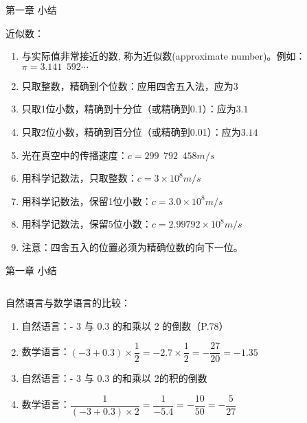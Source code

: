\documentclass[aspectratio=169]{ctexbeamer} %
\begin{document}
\begin{frame}[t]{第一章 小结}
\begin{spacing}{1.2}
\normalsize
\alert{近似数：}
\begin{enumerate}[label={\arabic*.}]
\item 与实际值非常接近的数, 称为近似数(approximate number)。例如：\\
$\pi = 3.141\phantom{e}592\cdots$
\item 只取整数，精确到个位数：应用四舍五入法，应为$3$
\item 只取1位小数，精确到十分位（或精确到0.1）：应为$3.1$
\item 只取2位小数，精确到百分位（或精确到0.01）：应为$3.14$
\item 光在真空中的传播速度：$c=299 \phantom{e} 792 \phantom{e} 458m/s$
\item 用科学记数法，只取整数：$c=3×10^8m/s$
\item 用科学记数法，保留1位小数：$c=3.0×10^8m/s$
\item 用科学记数法，保留5位小数：$c=2.99792×10^8m/s$
\item 注意：四舍五入的位置必须为精确位数的向下一位。
\end{enumerate}

\end{spacing}
\end{frame}

\begin{frame}[t]{第一章 小结}
\begin{columns}
\begin{spacing}{1.2}
\normalsize
\alert{自然语言与数学语言的比较：}
\begin{enumerate}[label={(\alph*)}]
\item 自然语言：- 3 与 0.3 的和乘以 2 的倒数（P.78）
\item 数学语言：$(-3 + 0.3) × \dfrac{1}{2} = -2.7 × \dfrac{1}{2} = -\dfrac{27}{20} = -1.35$
\item 自然语言：- 3 与 0.3 的和乘以 2\alert{的积}的倒数
\item 数学语言：$\dfrac{1}{(-3 + 0.3) × {2}} = \dfrac{1}{-5.4} = -\dfrac{10}{50} = -\dfrac{5}{27}$

\end{enumerate}

\end{spacing}
\end{columns}
\end{frame}


\end{document}
